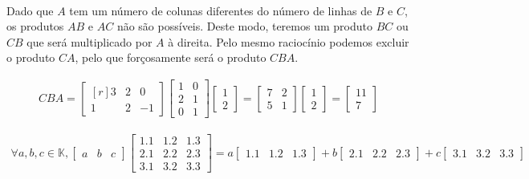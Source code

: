 \paragraph{} Dado que $A$ tem um número de colunas diferentes do número de
linhas de $B$ e $C$, os produtos $AB$ e $AC$ não são possíveis. Deste modo,
teremos um produto $BC$ ou $CB$ que será multiplicado por $A$ à direita. Pelo
mesmo raciocínio podemos excluir o produto $CA$, pelo que forçosamente
será o produto $CBA$.

\begin{align*}
	CBA =
	\begin{bmatrix*}[r]
		3 & 2 & 0\\
		1 & 2 & -1
	\end{bmatrix*}
	\begin{bmatrix*}
		1 & 0\\
		2 & 1\\
		0 & 1
	\end{bmatrix*}
	\begin{bmatrix*}
		1\\
		2
	\end{bmatrix*}
	=
	\begin{bmatrix*}
		7 & 2\\
		5 & 1
	\end{bmatrix*}
	\begin{bmatrix*}
		1\\
		2
	\end{bmatrix*}
	=
	\begin{bmatrix*}
		11\\
		7
	\end{bmatrix*}
\end{align*}

\clearpage


\begin{proposicao}\label{prop:tema-1-ex5-1}
	\begin{align*}
		\forall a, b, c \in \mathbb{K},
		\begin{bmatrix*}
			a & b & c
		\end{bmatrix*}
		\begin{bmatrix*}
			1.1 & 1.2 & 1.3\\
			2.1 & 2.2 & 2.3\\
			3.1 & 3.2 & 3.3
		\end{bmatrix*}
		=
		a
		\begin{bmatrix*}
			1.1 & 1.2 & 1.3
		\end{bmatrix*}
		+
		b
		\begin{bmatrix*}
			2.1 & 2.2 & 2.3
		\end{bmatrix*}
		+
		c
		\begin{bmatrix*}
			3.1 & 3.2 & 3.3
		\end{bmatrix*}
	\end{align*}
\end{proposicao}

